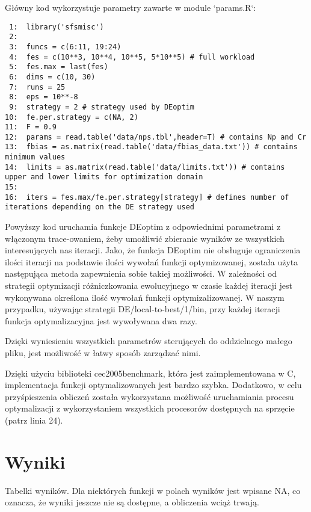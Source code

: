 \documentclass[11pt]{article}
\begin{document}
Główny kod wykorzystuje parametry zawarte w module `params.R`:


\begin{verbatim}
 1:  library('sfsmisc')
 2:  
 3:  funcs = c(6:11, 19:24)
 4:  fes = c(10**3, 10**4, 10**5, 5*10**5) # full workload
 5:  fes.max = last(fes)
 6:  dims = c(10, 30)
 7:  runs = 25
 8:  eps = 10**-8
 9:  strategy = 2 # strategy used by DEoptim
10:  fe.per.strategy = c(NA, 2)
11:  F = 0.9
12:  params = read.table('data/nps.tbl',header=T) # contains Np and Cr
13:  fbias = as.matrix(read.table('data/fbias_data.txt')) # contains minimum values
14:  limits = as.matrix(read.table('data/limits.txt')) # contains upper and lower limits for optimization domain
15:  
16:  iters = fes.max/fe.per.strategy[strategy] # defines number of iterations depending on the DE strategy used
\end{verbatim}

Powyższy kod uruchamia funkcje DEoptim z odpowiednimi parametrami z
włączonym trace-owaniem, żeby umożliwić zbieranie wyników ze
wszystkich interesujących nas iteracji. Jako, że funkcja DEoptim nie
obsługuje ograniczenia ilości iteracji na podstawie ilości wywołań
funkcji optymizowanej, została użyta następująca metoda zapewnienia
sobie takiej możliwości. W zależności od strategii optymizacji
różniczkowania ewolucyjnego w czasie każdej iteracji jest
wykonywana określona ilość wywołań funkcji optymizalizowanej. W naszym
przypadku, używając strategii DE/local-to-best/1/bin, przy każdej
iteracji funkcja optymalizacyjna jest wywoływana dwa razy.

Dzięki wyniesieniu wszystkich parametrów sterujących do oddzielnego
małego pliku, jest możliwość w łatwy sposób zarządzać nimi.

Dzięki użyciu biblioteki cec2005benchmark, która jest zaimplementowana
w C, implementacja funkcji optymalizowanych jest bardzo
szybka. Dodatkowo, w celu przyśpieszenia obliczeń została wykorzystana
możliwość uruchamiania procesu optymalizacji z wykorzystaniem
wszystkich procesorów dostępnych na sprzęcie (patrz linia 24).
\section{Wyniki}
\label{sec-4}


Tabelki wyników. Dla niektórych funkcji w polach wyników jest wpisane
NA, co oznacza, że wyniki jeszcze nie są dostępne, a obliczenia wciąż
trwają.
\end{document}
